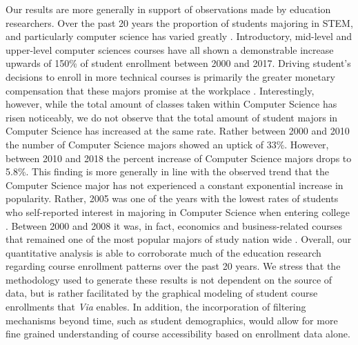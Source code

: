 \documentclass{sigchi}
\begin{document}
Our results are more generally in support of observations made by education researchers. Over the past 20 years the proportion of students majoring in STEM, and particularly computer science has varied greatly \cite{ComputingResearchAssociation2017}. Introductory, mid-level and upper-level computer sciences courses have all shown a demonstrable increase upwards of 150\% of student enrollment between 2000 and 2017. Driving student's decisions to enroll in more technical courses is primarily the greater monetary compensation that these majors promise at the workplace \cite{Downey2007}. Interestingly, however, while the total amount of classes taken within Computer Science has risen noticeably, we do not observe that the total amount of student majors in Computer Science has increased at the same rate. Rather between 2000 and 2010 the number of Computer Science majors showed an uptick of 33\%. However, between 2010 and 2018 the percent increase of Computer Science majors drops to 5.8\%. This finding is more generally in line with the observed trend that the Computer Science major has not experienced a constant exponential increase in popularity. Rather, 2005 was one of the years with the lowest rates of students who self-reported interest in majoring in Computer Science when entering college \cite{Patterson2005}. Between 2000 and 2008 it was, in fact, economics and business-related courses that remained one of the most popular majors of study nation wide \cite{NationalCenterforEducation2018}. Overall, our quantitative analysis is able to corroborate much of the education research regarding course enrollment patterns over the past 20 years. We stress that the methodology used to generate these results is not dependent on the source of data, but is rather facilitated by the graphical modeling of student course enrollments that \textit{Via} enables. In addition, the incorporation of filtering mechanisms beyond time, such as student demographics, would allow for more fine grained understanding of course accessibility based on enrollment data alone.
\end{document}
